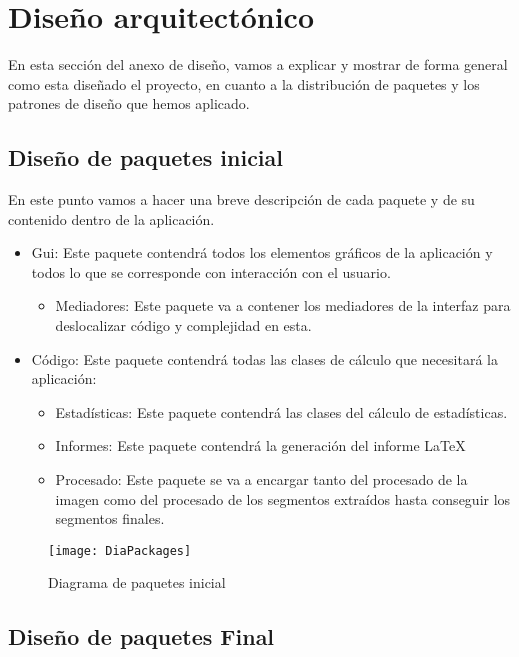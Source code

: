 \section{Diseño arquitectónico}

En esta sección del anexo de diseño, vamos a explicar y mostrar de forma general como esta diseñado el proyecto, en cuanto a la distribución de paquetes y los patrones de diseño que hemos aplicado.

\subsection{Diseño de paquetes inicial}

En este punto vamos a hacer una breve descripción de cada paquete y de su contenido dentro de la aplicación.

\begin{itemize}
\item Gui:
Este paquete contendrá todos los elementos gráficos de la aplicación y todos lo que se corresponde con interacción con el usuario.
	\begin{itemize}
	\item Mediadores:
	Este paquete va a contener los mediadores de la interfaz para deslocalizar código y complejidad en esta.
	\end{itemize}
\item Código: Este paquete contendrá todas las clases de cálculo que necesitará la aplicación:
	\begin{itemize}
	\item Estadísticas:
	Este paquete contendrá las clases del cálculo de estadísticas.
	\item Informes:
	Este paquete contendrá la generación del informe \LaTeX
	\item Procesado:
	Este paquete se va a encargar tanto del procesado de la imagen 			como del procesado de los segmentos extraídos hasta conseguir los 		segmentos finales.
	\end{itemize}
\end{itemize}

\begin{figure}[h]
	\centering
	\texttt{[image: DiaPackages]}
	\caption{Diagrama de paquetes inicial}
	\label{fig:C.1.2}
\end{figure}

\subsection{Diseño de paquetes Final}


